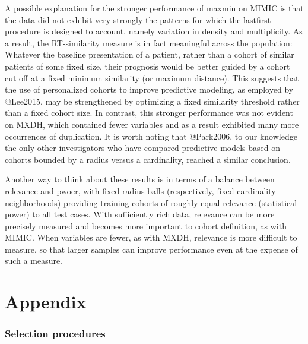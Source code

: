 \documentclass[
]{article}
\begin{document}
A possible explanation for the stronger performance of maxmin on MIMIC
is that the data did not exhibit very strongly the patterns for which
the lastfirst procedure is designed to account, namely variation in
density and multiplicity. As a result, the RT-similarity measure is in
fact meaningful across the population: Whatever the baseline
presentation of a patient, rather than a cohort of similar patients of
some fixed size, their prognosis would be better guided by a cohort cut
off at a fixed minimum similarity (or maximum distance). This suggests
that the use of personalized cohorts to improve predictive modeling, as
employed by @Lee2015, may be strengthened by optimizing a fixed
similarity threshold rather than a fixed cohort size. In contrast, this
stronger performance was not evident on MXDH, which contained fewer
variables and as a result exhibited many more occurrences of
duplication. It is worth noting that @Park2006, to our knowledge the
only other investigators who have compared predictive models based on
cohorts bounded by a radius versus a cardinality, reached a similar
conclusion.

Another way to think about these results is in terms of a balance
between relevance and pwoer, with fixed-radius balls (respectively,
fixed-cardinality neighborhoods) providing training cohorts of roughly
equal relevance (statistical power) to all test cases. With sufficiently
rich data, relevance can be more precisely measured and becomes more
important to cohort definition, as with MIMIC. When variables are fewer,
as with MXDH, relevance is more difficult to measure, so that larger
samples can improve performance even at the expense of such a measure.

\hypertarget{appendix}{%
\section{Appendix}\label{appendix}}

\hypertarget{selection-procedures}{%
\subsubsection{Selection procedures}\label{selection-procedures}}
\end{document}
